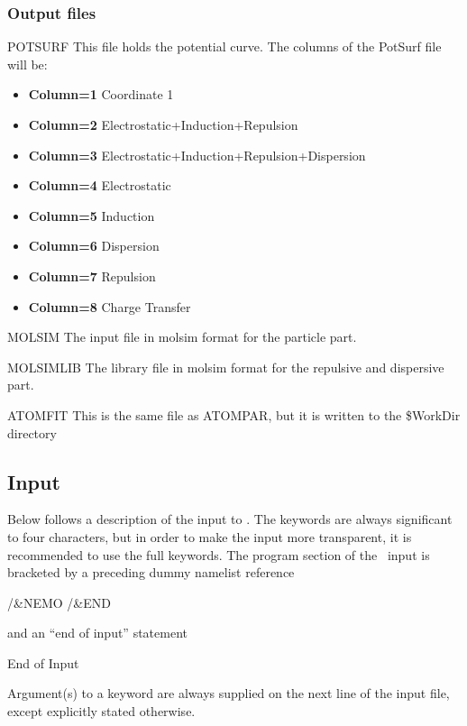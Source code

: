 \subsubsection{Output files}

\begin{filelist}
\item[POTSURF]
This file holds the potential curve. The columns of the PotSurf file will be:
\begin{itemize}
\itemsep 9pt plus 3pt minus 3pt
\item
{\bf Column=1}
Coordinate 1
\item
{\bf Column=2}
Electrostatic+Induction+Repulsion
\item
{\bf Column=3}
Electrostatic+Induction+Repulsion+Dispersion
\item
{\bf Column=4}
Electrostatic
\item
{\bf Column=5}
Induction
\item
{\bf Column=6}
Dispersion
\item
{\bf Column=7}
Repulsion
\item
{\bf Column=8}
Charge Transfer
\end{itemize}
\item[MOLSIM]
The input file in molsim format for the particle part.
\item[MOLSIMLIB]
The library file in molsim format for the repulsive and dispersive part.
\item[ATOMFIT]
This is the same file as ATOMPAR, but it is written to the \$WorkDir directory
\end{filelist}

\subsection{Input}
\label{UG:sec:nemo_input}

Below follows a description of the input to . The keywords
are always significant to four characters, but in order to make the
input more transparent, it is recommended to use the full keywords.
The  program section of the \molcas\ input is bracketed by
a preceding dummy namelist reference
\begin{inputlisting}
/&NEMO /&END
\end{inputlisting}
and an ``end of input'' statement
\begin{inputlisting}
End of Input
\end{inputlisting}
Argument(s) to a keyword are always supplied on the next line of the
input file, except explicitly stated otherwise.

